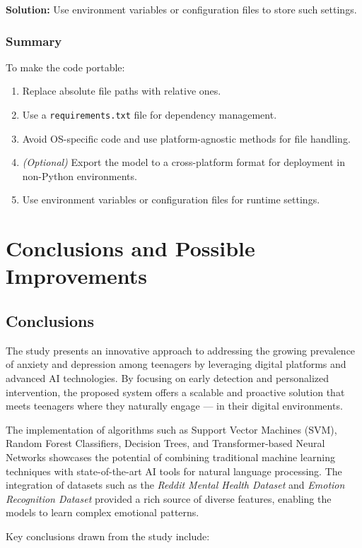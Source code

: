 \documentclass[runningheads,a4paper,11pt]{report}
\begin{document}
\textbf{Solution:} Use environment variables or configuration files to store such settings.

\subsection{Summary}
\label{section:summary}
To make the code portable:
\begin{enumerate}
    \item Replace absolute file paths with relative ones.
    \item Use a \texttt{requirements.txt} file for dependency management.
    \item Avoid OS-specific code and use platform-agnostic methods for file handling.
    \item \textit{(Optional)} Export the model to a cross-platform format for deployment in non-Python environments.
    \item Use environment variables or configuration files for runtime settings.
\end{enumerate}

\chapter{Conclusions and Possible Improvements}
\label{chapter:conclusions}

\section{Conclusions}
The study presents an innovative approach to addressing the growing prevalence of anxiety and depression among teenagers by leveraging digital platforms and advanced AI technologies. By focusing on early detection and personalized intervention, the proposed system offers a scalable and proactive solution that meets teenagers where they naturally engage — in their digital environments.

The implementation of algorithms such as Support Vector Machines (SVM), Random Forest Classifiers, Decision Trees, and Transformer-based Neural Networks showcases the potential of combining traditional machine learning techniques with state-of-the-art AI tools for natural language processing. The integration of datasets such as the \textit{Reddit Mental Health Dataset} and \textit{Emotion Recognition Dataset} provided a rich source of diverse features, enabling the models to learn complex emotional patterns.

Key conclusions drawn from the study include:
\end{document}
